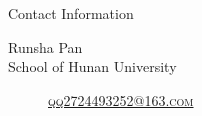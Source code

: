 \documentclass[
 size=14pt,
 paper=smartboard,  %
 mode=present, 		%
 display=slides, 	%
 style=tuliplab,  	%
 pauseslide,
 fleqn,leqno]{powerdot}
\begin{document}
  
  
  
  








\begin{wideslide}[toc=,bm=]{Contact Information}
\centering
{}
\twocolumn[
lcolwidth=0.35\linewidth,
rcolwidth=0.65\linewidth
]
{
}
{
Runsha Pan\\
School of Hunan University\\
\begin{description}
 \item[\textcolor{orange}{\faEnvelope}] \href{mailto:qq2724493252@163.com}
 {\textsc{\footnotesize{qq2724493252@163.com}}}

\end{description}
}
\end{wideslide}
\end{document}
